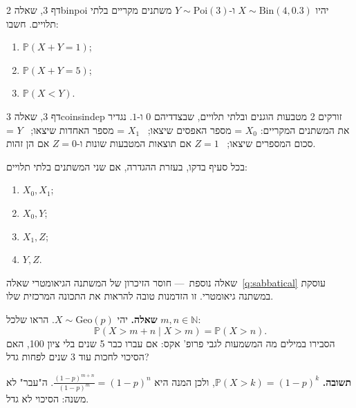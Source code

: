 \documentclass[11pt,a4paper]{report}
\newcommand{\N}{\mathbb{N}}
\newcommand{\PP}{\mathbb{P}}
\newcommand{\Bin}{\mathrm{Bin}}
\newcommand{\Geo}{\mathrm{Geo}}
\newcommand{\Poi}{\mathrm{Poi}}
\newcommand{\dash}{{\rmfamily —}}
\begin{document}
\begin{exercise}{דף 3, שאלה 2}{binpoi}
יהיו $X\sim\Bin(4,0.3)$ ו-$Y\sim\Poi(3)$ משתנים מקריים בלתי תלויים. חשבו:
\begin{enumerate}[label=(\alph*)]
  \item $\PP(X+Y=1)$;
  \item $\PP(X+Y=5)$;
  \item $\PP(X<Y)$.
\end{enumerate}
\end{exercise}

\begin{exercise}{דף 3, שאלה 3}{coinsindep}
זורקים 2 מטבעות הוגנים ובלתי תלויים, שבצדדיהם $0$ ו-$1$. נגדיר את המשתנים המקריים:
$X_0$ = מספר האפסים שיצאו; \ $X_1$ = מספר האחדות שיצאו; \ $Y$ = סכום המספרים שיצאו; \ $Z=1$ אם תוצאות המטבעות שונות ו-$Z=0$ אם הן זהות.

בכל סעיף בדקו, בעזרת ההגדרה, אם שני המשתנים בלתי תלויים:
\begin{enumerate}[label=(\alph*)]
  \item $X_0,X_1$;
  \item $X_0,Y$;
  \item $X_1,Z$;
  \item $Y,Z$.
\end{enumerate}
\end{exercise}

\begin{suggestion}{שאלה נוספת~\dash{} חוסר הזיכרון של המשתנה הגיאומטרי}
שאלה~\ref{q:sabbatical} עוסקת במשתנה גיאומטרי. זו הזדמנות טובה להראות את התכונה המרכזית שלו.

\textbf{שאלה.} יהי $X\sim\Geo(p)$. הראו שלכל $m,n\in\N$:
\[
  \PP(X>m+n\mid X>m)=\PP(X>n).
\]
הסבירו במילים מה המשמעות לגבי פרופ' אקס: אם עברו כבר 5 שנים בלי ציון 100, האם הסיכוי לחכות עוד 3 שנים לפחות גדל?

\textbf{תשובה.} $\PP(X>k)=(1-p)^k$, ולכן המנה היא $\frac{(1-p)^{m+n}}{(1-p)^m}=(1-p)^n$. ה"עבר" לא משנה: הסיכוי לא גדל.
\end{suggestion}
\end{document}
